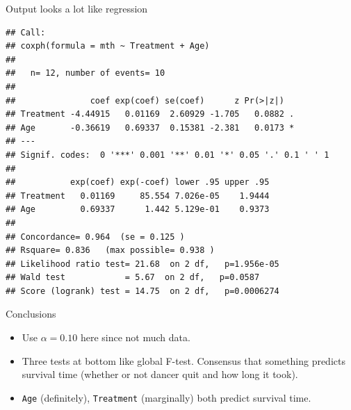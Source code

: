 \begin{frame}[fragile]{Output looks a lot like regression}

{\footnotesize
 
\begin{knitrout}
\color{fgcolor}\begin{kframe}
\begin{alltt}
\end{alltt}
\begin{verbatim}
## Call:
## coxph(formula = mth ~ Treatment + Age)
## 
##   n= 12, number of events= 10 
## 
##               coef exp(coef) se(coef)      z Pr(>|z|)  
## Treatment -4.44915   0.01169  2.60929 -1.705   0.0882 .
## Age       -0.36619   0.69337  0.15381 -2.381   0.0173 *
## ---
## Signif. codes:  0 '***' 0.001 '**' 0.01 '*' 0.05 '.' 0.1 ' ' 1
## 
##           exp(coef) exp(-coef) lower .95 upper .95
## Treatment   0.01169     85.554 7.026e-05    1.9444
## Age         0.69337      1.442 5.129e-01    0.9373
## 
## Concordance= 0.964  (se = 0.125 )
## Rsquare= 0.836   (max possible= 0.938 )
## Likelihood ratio test= 21.68  on 2 df,   p=1.956e-05
## Wald test            = 5.67  on 2 df,   p=0.0587
## Score (logrank) test = 14.75  on 2 df,   p=0.0006274
\end{verbatim}
\end{kframe}
\end{knitrout}
}
  
\end{frame}

\begin{frame}[fragile]{Conclusions}

  \begin{itemize}
  \item Use $\alpha=0.10$ here since not much data.
  \item Three tests at bottom like global F-test. Consensus that
    something predicts survival time (whether or not dancer quit and how
    long it took).
  \item \texttt{Age} (definitely), \texttt{Treatment} (marginally) both
    predict survival time.
  \end{itemize}


  
\end{frame}

